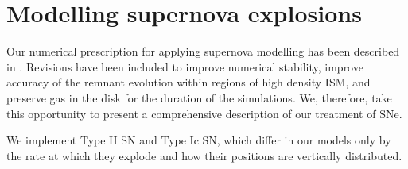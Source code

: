 \documentclass[iop,apj,numberedappendix,twocolappendix]{emulateapj}
\begin{document}
\section[]{Modelling supernova explosions}
\label{sect:SNe}

Our numerical prescription for applying supernova modelling has been described
in \citet{GSFSM13,Gent2012}.
Revisions have been included to improve numerical stability, improve accuracy 
of the remnant evolution within regions of high density ISM, and preserve gas
in the disk for the duration of the simulations.
We, therefore, take this opportunity to present a comprehensive description of
our treatment of SNe.

We implement Type II SN and Type Ic SN, which differ in our models only by the
rate at which they explode and how their positions are vertically distributed.
\end{document}
